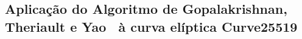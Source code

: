 \subsection{Aplicação do Algoritmo de Gopalakrishnan, Theriault e Yao~\cite{GopalakrishnanTheriaultYao07} à curva elíptica Curve25519}

